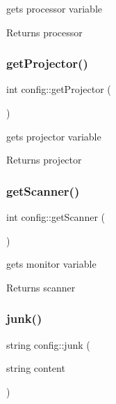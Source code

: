 gets processor variable 

\begin{DoxyReturn}{Returns}
processor 
\end{DoxyReturn}
\mbox{\label{classconfig_aae8fea6c3b76d240bbd9eadaa16fc11c}} 
\subsubsection{\texorpdfstring{getProjector()}{getProjector()}}
{\footnotesize\ttfamily int config\+::get\+Projector (\begin{DoxyParamCaption}{ }\end{DoxyParamCaption})}



gets projector variable 

\begin{DoxyReturn}{Returns}
projector 
\end{DoxyReturn}
\mbox{\label{classconfig_a6ee8004748fd4a64a611a3001509e878}} 
\subsubsection{\texorpdfstring{getScanner()}{getScanner()}}
{\footnotesize\ttfamily int config\+::get\+Scanner (\begin{DoxyParamCaption}{ }\end{DoxyParamCaption})}



gets monitor variable 

\begin{DoxyReturn}{Returns}
scanner 
\end{DoxyReturn}
\mbox{\label{classconfig_af3601cc6eb1a184fb1cf746a883b8bb5}} 
\subsubsection{\texorpdfstring{junk()}{junk()}}
{\footnotesize\ttfamily string config\+::junk (\begin{DoxyParamCaption}\item[{string}]{content }\end{DoxyParamCaption})}



